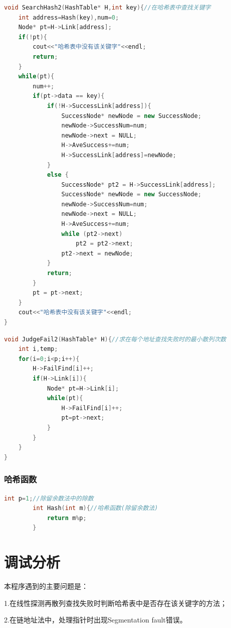 \documentclass{ctexart}
\begin{document}
	\begin{lstlisting}[language=C++, caption=在哈希表中查找关键字]
void SearchHash2(HashTable* H,int key){//在哈希表中查找关键字
    int address=Hash(key),num=0;
    Node* pt=H->Link[address];
    if(!pt){
        cout<<"哈希表中没有该关键字"<<endl;
        return;
    }
    while(pt){
        num++;
        if(pt->data == key){
            if(!H->SuccessLink[address]){
                SuccessNode* newNode = new SuccessNode;
                newNode->SuccessNum=num;
                newNode->next = NULL;
                H->AveSuccess+=num;
                H->SuccessLink[address]=newNode;
            }
            else {
                SuccessNode* pt2 = H->SuccessLink[address];
                SuccessNode* newNode = new SuccessNode;
                newNode->SuccessNum=num;
                newNode->next = NULL;
                H->AveSuccess+=num;
                while (pt2->next) 
                    pt2 = pt2->next;
                pt2->next = newNode;
            }
            return;
        }
        pt = pt->next;
    }
    cout<<"哈希表中没有该关键字"<<endl;   
}
	\end{lstlisting}
	\begin{lstlisting}[language=C++, caption=求在每个地址查找失败时的最小散列次数]
void JudgeFail2(HashTable* H){//求在每个地址查找失败时的最小散列次数
    int i,temp;
    for(i=0;i<p;i++){
        H->FailFind[i]++;
        if(H->Link[i]){
            Node* pt=H->Link[i];
            while(pt){
                H->FailFind[i]++;
                pt=pt->next;
            }
        }
    }
}
	\end{lstlisting}

	\subsubsection{哈希函数}
	\begin{lstlisting}[language=C++, caption=哈希函数(除留余数法)]
		int p=1;//除留余数法中的除数
		int Hash(int m){//哈希函数(除留余数法)
			return m%p;
		}
	\end{lstlisting}
	
	\section{调试分析}
	本程序遇到的主要问题是：

	1.在线性探测再散列查找失败时判断哈希表中是否存在该关键字的方法；

	2.在链地址法中，处理指针时出现Segmentation fault错误。
\end{document}
